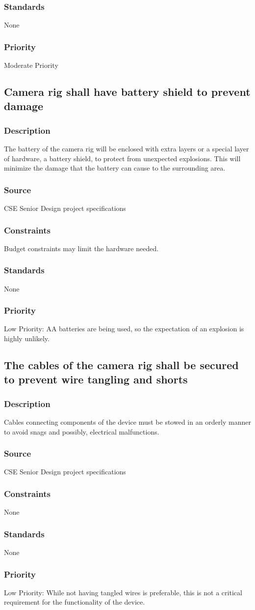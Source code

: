\subsubsection{Standards}
None
\subsubsection{Priority}
Moderate Priority

\subsection{Camera rig shall have battery shield to prevent damage}
\subsubsection{Description}
The battery of the camera rig will be enclosed with extra layers or a special layer of hardware, a battery shield, to protect from unexpected explosions. This will minimize the damage that the battery can cause to the surrounding area.
\subsubsection{Source}
CSE Senior Design project specifications
\subsubsection{Constraints}
Budget constraints may limit the hardware needed.
\subsubsection{Standards}
None
\subsubsection{Priority}
Low Priority: AA batteries are being used, so the expectation of an explosion is highly unlikely.

\subsection{The cables of the camera rig shall be secured to prevent wire tangling and shorts}
\subsubsection{Description}
Cables connecting components of the device must be stowed in an orderly manner to avoid snags and possibly, electrical malfunctions.
\subsubsection{Source}
CSE Senior Design project specifications
\subsubsection{Constraints}
None
\subsubsection{Standards}
None
\subsubsection{Priority}
Low Priority: While not having tangled wires is preferable, this is not a critical requirement for the functionality of the device.